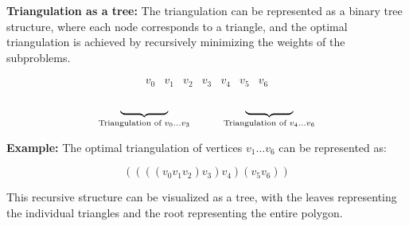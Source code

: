 \textbf{Triangulation as a tree:} The triangulation can be represented as a binary tree structure, where each node corresponds to a triangle, and the optimal triangulation is achieved by recursively minimizing the weights of the subproblems.
    
\[
\begin{array}{ccccccccc}
v_0 & v_1 & v_2 & v_3 & v_4 & v_5 & v_6 \\
\end{array}
\]
\[
\begin{array}{c}
\underbrace{\hspace{1.5cm}}_{\text{Triangulation of } v_0 \dots v_3} \hspace{1cm} \underbrace{\hspace{1.5cm}}_{\text{Triangulation of } v_4 \dots v_6}
\end{array}
\]
    
    \textbf{Example:} The optimal triangulation of vertices \(v_1 \dots v_6\) can be represented as:
    
    \[
    ((((v_0 v_1 v_2) v_3) v_4) (v_5 v_6))
    \]
    
    This recursive structure can be visualized as a tree, with the leaves representing the individual triangles and the root representing the entire polygon.

